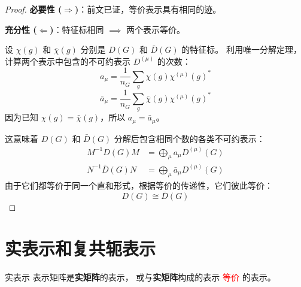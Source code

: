 \begin{proof}
    \textbf{必要性 ($\Rightarrow$)}：前文已证，等价表示具有相同的迹。
    
    \textbf{充分性 ($\Leftarrow$)}：特征标相同 $\implies$ 两个表示等价。
    
    设 $\chi(g)$ 和 $\bar{\chi}(g)$ 分别是 $D(G)$ 和 $\bar{D}(G)$ 的特征标。
    利用唯一分解定理，计算两个表示中包含的不可约表示 $D^{(\mu)}$ 的次数：
    \begin{equation}
        a_\mu = \frac{1}{n_G} \sum_g \chi(g) \chi^{(\mu)}(g)^*
    \end{equation}
    \begin{equation}
        \bar{a}_\mu = \frac{1}{n_G} \sum_g \bar{\chi}(g) \chi^{(\mu)}(g)^*
    \end{equation}
    因为已知 $\chi(g) = \bar{\chi}(g)$，所以 $a_\mu = \bar{a}_\mu$。
    
    这意味着 $D(G)$ 和 $\bar{D}(G)$ 分解后包含相同个数的各类不可约表示：
    \begin{equation}
        \begin{aligned}
            M^{-1} D(G) M &= \bigoplus_\mu a_\mu D^{(\mu)}(G) \\
            N^{-1} \bar{D}(G) N &= \bigoplus_\mu \bar{a}_\mu D^{(\mu)}(G)
        \end{aligned}
    \end{equation}
    由于它们都等价于同一个直和形式，根据等价的传递性，它们彼此等价：
    \begin{equation}
        D(G) \cong \bar{D}(G)
    \end{equation}
\end{proof}



\section{实表示和复共轭表示}

\begin{definition}{实表示}
    表示矩阵是\textbf{实矩阵}的表示，
    或与\textbf{实矩阵}构成的表示 \textcolor{red}{等价} 的表示。
\end{definition}

